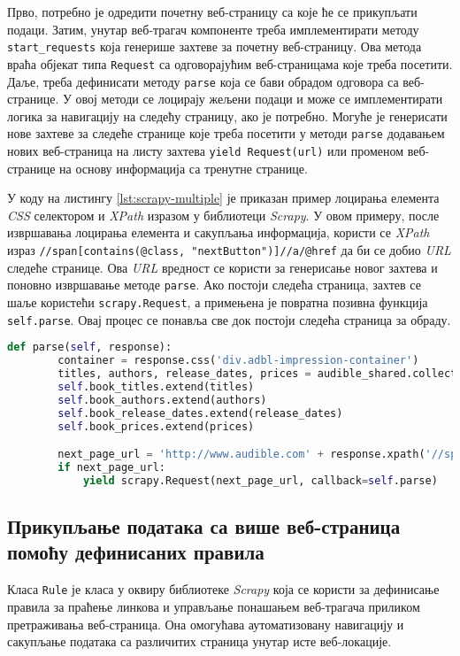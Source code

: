 \documentclass[12pt,oneside]{memoir}
\begin{document}
Прво, потребно је одредити почетну веб-страницу са које ће се прикупљати подаци. Затим, унутар веб-трагач компоненте треба имплементирати методу \texttt{start\_requests} која генерише захтеве за почетну веб-страницу. Ова метода враћа објекат типа \texttt{Request} са одговорајућим веб-страницама које треба посетити. Даље, треба дефинисати методу \texttt{parse} која се бави обрадом одговора са веб-странице. У овој методи се лоцирају жељени подаци и може се имплементирати логика за навигацију на следећу страницу, ако је потребно. Могуће је генерисати нове захтеве за следеће странице које треба посетити у методи \texttt{parse} додавањем нових веб-страница на листу захтева \texttt{yield Request(url)} или променом веб-странице на основу информација са тренутне странице.

У коду на листингу \ref{lst:scrapy-multiple} је приказан пример лоцирања елемента \textit{CSS} селектором и \textit{XPath} изразом у библиотеци \textit{Scrapy}. У овом примеру, после извршавања лоцирања елемента и сакупљања информација, користи се  \textit{XPath} израз \texttt{//span[contains(@class, "nextButton")]//a/@href}  да би се добио \textit{URL} следеће странице. Ова \textit{URL} вредност се користи за генерисање новог захтева и поновно извршавање методе \texttt{parse}. Ако постоји следећа страница, захтев се шаље користећи \texttt{scrapy.Request}, а примењена је повратна позивна функција \texttt{self.parse}. Овај процес се понавља све док постоји следећа страница за обраду.

\begin{lstlisting}[language=Python, caption={Прикупљање података са више страница}, label={lst:scrapy-multiple}]
    def parse(self, response):
        container = response.css('div.adbl-impression-container')
        titles, authors, release_dates, prices = audible_shared.collect_books_info(container)
        self.book_titles.extend(titles)
        self.book_authors.extend(authors)
        self.book_release_dates.extend(release_dates)
        self.book_prices.extend(prices)

        next_page_url = 'http://www.audible.com' + response.xpath('//span[contains(@class, "nextButton")]//a/@href').get()
        if next_page_url:
            yield scrapy.Request(next_page_url, callback=self.parse)     
\end{lstlisting}

\subsection{Прикупљање података са више веб-страница помоћу дефинисаних правила}
Класа \texttt{Rule} је класа у оквиру библиотеке \textit{Scrapy} која се користи за дефинисање правила за праћење линкова и управљање понашањем веб-трагача приликом претраживања веб-страница. Она омогућава аутоматизовану навигацију и сакупљање података са различитих страница унутар исте веб-локације.
\end{document}
